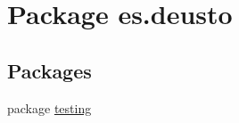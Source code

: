 \hypertarget{namespacees_1_1deusto}{}\section{Package es.\+deusto}
\label{namespacees_1_1deusto}
\subsection*{Packages}
\begin{DoxyCompactItemize}
\item 
package \mbox{\hyperlink{namespacees_1_1deusto_1_1testing}{testing}}
\end{DoxyCompactItemize}

